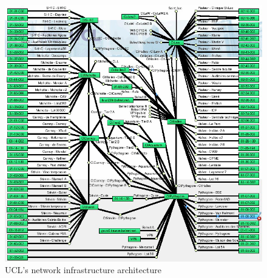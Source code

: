 \begin{figure}[H]
	\includegraphics[width=1\linewidth]{Pictures/Chapter2/infra.png}
	\caption{UCL's network infrastructure architecture}
\end{figure}




